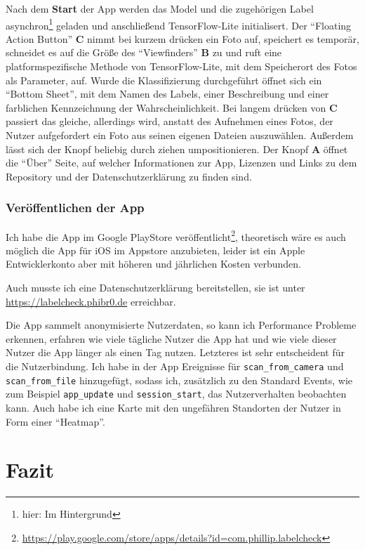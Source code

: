 Nach dem \textbf{Start} der App werden das Model und die zugehörigen Label asynchron\footnote{hier: Im Hintergrund} geladen und anschließend TensorFlow-Lite initialisert. Der "`Floating Action Button"' \textbf{C} nimmt bei kurzem drücken ein Foto auf, speichert es temporär, schneidet es auf die Größe des "`Viewfinders"' \textbf{B} zu und ruft eine platformspezifische Methode von TensorFlow-Lite, mit dem Speicherort des Fotos als Parameter, auf. Wurde die Klassifizierung durchgeführt öffnet sich ein "`Bottom Sheet"', mit dem Namen des Labels, einer Beschreibung und einer farblichen Kennzeichnung der Wahrscheinlichkeit. Bei langem drücken von \textbf{C} passiert das gleiche, allerdings wird, anstatt des Aufnehmen eines Fotos, der Nutzer aufgefordert ein Foto aus seinen eigenen Dateien auszuwählen. Außerdem lässt sich der Knopf beliebig durch ziehen umpositionieren. Der Knopf \textbf{A} öffnet die "`Über"' Seite, auf welcher Informationen zur App, Lizenzen und Links zu dem Repository und der Datenschutzerklärung zu finden sind.

\subsubsection{Veröffentlichen der App}

Ich habe die App im Google PlayStore veröffentlicht\footnote{\url{https://play.google.com/store/apps/details?id=com.phillip.labelcheck}}, theoretisch wäre es auch möglich die App für iOS im Appstore anzubieten, leider ist ein Apple Entwicklerkonto aber mit höheren und jährlichen Kosten verbunden.

Auch musste ich eine Datenschutzerklärung bereitstellen, sie ist unter \url{https://labelcheck.phibr0.de} erreichbar.

Die App sammelt anonymisierte Nutzerdaten, so kann ich Performance Probleme erkennen, erfahren wie viele tägliche Nutzer die App hat und wie viele dieser Nutzer die App länger als einen Tag nutzen. Letzteres ist sehr entscheident für die Nutzerbindung. Ich habe in der App Ereignisse für \texttt{scan_from_camera} und \texttt{scan_from_file} hinzugefügt, sodass ich, zusätzlich zu den Standard Events, wie zum Beispiel \texttt{app_update} und \texttt{session_start}, das Nutzerverhalten beobachten kann. Auch habe ich eine Karte mit den ungefähren Standorten der Nutzer in Form einer "`Heatmap"'.

\section{Fazit}

